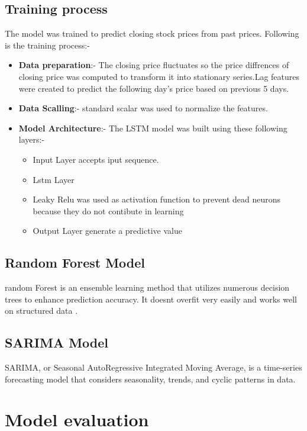 \documentclass{article}
\begin{document}
\subsection{Training process}
The model was trained to predict closing stock prices from past prices. Following is the training process:- 
    \begin{itemize}
        \item \textbf{Data preparation}:- The closing price fluctuates so the price diffrences of closing price was computed to transform it into stationary series.Lag features were created to predict the following day's price based on previous 5 days.
        \item \textbf{Data Scalling}:- standard scalar was used to normalize the features.
        \item \textbf{Model Architecture}:- The LSTM model was built using these following layers:-
        \begin{itemize}
            \item Input Layer accepts iput sequence.
            \item Lstm Layer
            \item Leaky Relu was used as activation function to prevent dead neurons because they do not contibute in learning
            \item Output Layer generate a predictive value 
        \end{itemize}
    \end{itemize}

\subsection{Random Forest Model}
random Forest is an ensemble learning method that utilizes numerous decision trees to enhance prediction accuracy. It doesnt overfit very easily and works well on structured data .

\subsection{SARIMA Model}
SARIMA, or Seasonal AutoRegressive Integrated Moving Average, is a time-series forecasting model that considers seasonality, trends, and cyclic patterns in data.

\section{Model evaluation}
\end{document}
